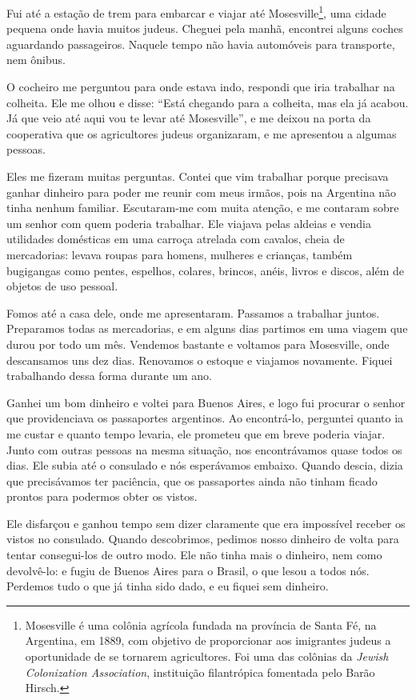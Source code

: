 Fui até a estação de trem para embarcar e viajar até
Mosesville\footnote{Mosesville é uma colônia agrícola fundada na província de
  Santa Fé, na Argentina, em 1889, com objetivo de proporcionar aos
  imigrantes judeus a oportunidade de se tornarem agricultores. Foi uma
  das colônias da \textit{Jewish Colonization Association}, instituição
  filantrópica fomentada pelo Barão Hirsch.}, uma cidade pequena onde
havia muitos judeus. Cheguei pela manhã, encontrei alguns coches aguardando passageiros. Naquele tempo não havia
automóveis para transporte, nem ônibus.

O cocheiro me perguntou para onde estava indo, respondi que iria
trabalhar na colheita. Ele me olhou e disse: ``Está chegando para a
colheita, mas ela já acabou. Já que veio até aqui vou te levar até
Mosesville'', e me deixou na porta da cooperativa que os agricultores
judeus organizaram, e me apresentou a algumas pessoas.

Eles me fizeram muitas perguntas. Contei que vim trabalhar porque
precisava ganhar dinheiro para poder me reunir com meus irmãos, pois 
na Argentina não tinha nenhum familiar. Escutaram-me com
muita atenção, e me contaram sobre um senhor com quem poderia trabalhar. Ele
viajava pelas aldeias e vendia utilidades domésticas em uma carroça
atrelada com cavalos, cheia de mercadorias: levava roupas para homens,
mulheres e crianças, também bugigangas como pentes, espelhos, colares,
brincos, anéis, livros e discos, além de objetos de uso pessoal.

Fomos até a casa dele, onde me apresentaram. Passamos a trabalhar juntos.
Preparamos todas as mercadorias, e em alguns dias partimos em uma viagem
que durou por todo um mês. Vendemos bastante e voltamos para
Mosesville, onde descansamos uns dez dias. Renovamos o estoque e
viajamos novamente. Fiquei trabalhando dessa forma durante um ano.

Ganhei um bom dinheiro e voltei para Buenos Aires, e logo fui procurar o
senhor que providenciava os passaportes argentinos. Ao encontrá-lo, perguntei quanto ia me 
custar e quanto tempo levaria, ele prometeu que em breve poderia viajar. 
Junto com outras pessoas na mesma situação, nos encontrávamos quase todos os dias.
Ele subia até o consulado e nós esperávamos embaixo. Quando descia, dizia
que precisávamos ter paciência, que os passaportes ainda não tinham
ficado prontos para podermos obter os vistos.

Ele disfarçou e ganhou tempo sem dizer claramente que era impossível
receber os vistos no consulado. Quando descobrimos, pedimos
nosso dinheiro de volta para tentar consegui-los de outro modo.
Ele não tinha mais o dinheiro, nem como devolvê-lo: e fugiu de Buenos
Aires para o Brasil, o que lesou a todos nós. Perdemos tudo o que já tinha
sido dado, e eu fiquei sem dinheiro.

